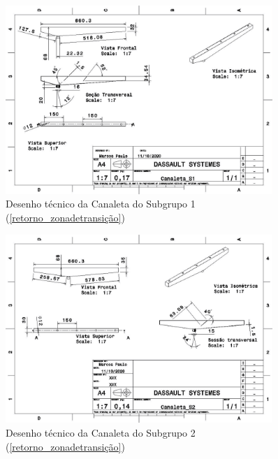 \begin{apendicesenv}
\begin{figure}[H]
    \centering
    \includegraphics[width=0.9\textwidth]{figuras/estrutura/Desenhos/Canaleta_Subgrupo1.jpg}
    \caption{Desenho técnico da Canaleta do Subgrupo 1 (\ref{retorno_zonadetransição})}
    \label{fig:canaletaS1}
\end{figure}

\begin{figure}[H]
    \centering
    \includegraphics[width=0.9\textwidth]{figuras/estrutura/Desenhos/Canaleta_S2.jpg}
    \caption{Desenho técnico da Canaleta do Subgrupo 2 (\ref{retorno_zonadetransição})}
    \label{fig:canaletaS2}
\end{figure}


\end{apendicesenv}
